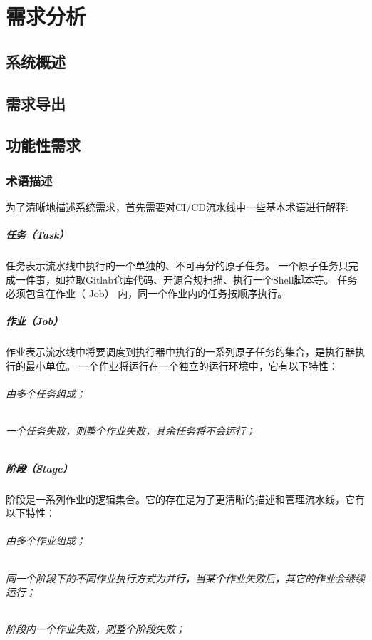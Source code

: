 
\chapter{需求分析}

\section{系统概述}

\section{需求导出}

\section{功能性需求}

\subsection{术语描述}
为了清晰地描述系统需求，首先需要对CI/CD流水线中一些基本术语进行解释:

\paragraph{任务（Task）}
任务表示流水线中执行的一个单独的、不可再分的原子任务。
一个原子任务只完成一件事，如拉取Gitlab仓库代码、开源合规扫描、执行一个Shell脚本等。
任务必须包含在作业（ Job） 内，同一个作业内的任务按顺序执行。

\paragraph{作业（Job）}
作业表示流水线中将要调度到执行器中执行的一系列原子任务的集合，是执行器执行的最小单位。
一个作业将运行在一个独立的运行环境中，它有以下特性：
\subparagraph{由多个任务组成；}
\subparagraph{一个任务失败，则整个作业失败，其余任务将不会运行；}

\paragraph{阶段（Stage）}
阶段是一系列作业的逻辑集合。它的存在是为了更清晰的描述和管理流水线，它有以下特性：
\subparagraph{由多个作业组成；}
\subparagraph{同一个阶段下的不同作业执行方式为并行，当某个作业失败后，其它的作业会继续运行；}
\subparagraph{阶段内一个作业失败，则整个阶段失败；}

